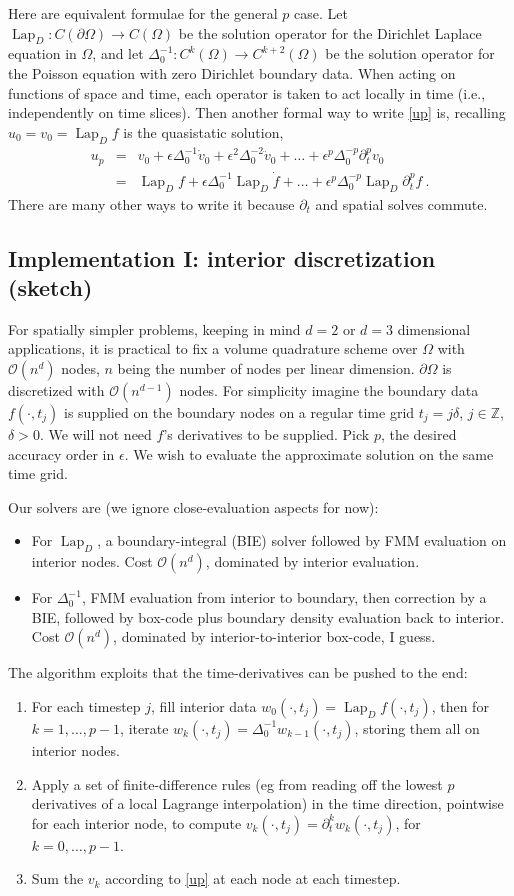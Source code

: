 \documentclass[10pt]{article}
\newcommand{\bi}{\begin{itemize}}
\newcommand{\ei}{\end{itemize}}
\newcommand{\ben}{\begin{enumerate}}
\newcommand{\een}{\end{enumerate}}
\newcommand{\bea}{\begin{eqnarray}}
\newcommand{\eea}{\end{eqnarray}}
\newcommand{\Z}{\mathbb{Z}}
\newcommand{\bigO}{{\mathcal O}}
\newcommand{\pO}{{\partial\Omega}}
\newcommand{\eps}{\epsilon}
\newcommand{\dt}{\partial_t}
\DeclareMathOperator{\Lap}{Lap}
\begin{document}
Here are equivalent formulae for the general $p$ case.
Let $\Lap_D: C(\pO) \to C(\Omega)$ be the solution operator for the Dirichlet
Laplace equation in $\Omega$, and let $\Delta_0^{-1} : C^k(\Omega) \to
C^{k+2}(\Omega)$ be the solution operator for the Poisson equation with
zero Dirichlet boundary data. When acting on functions of
space and time, each operator is taken to act locally in time
(i.e., independently on time slices).
Then another formal way to write \eqref{up} is, recalling $u_0=v_0=\Lap_D f$ is
the quasistatic solution,
\bea
u_p &=& v_0 + \eps \Delta_0^{-1} \dot v_0 + \eps^2 \Delta_0^{-2} \ddot v_0 +
\dots + \eps^{p} \Delta_0^{-p} \dt^{p} v_0
\\
&=&
\Lap_D f + \eps \Delta_0^{-1} \Lap_D \dot f + \ldots
+ \eps^{p} \Delta_0^{-p} \Lap_D \dt^{p} f
~.
\label{upformal}
\eea
There are many other ways to write it because $\dt$ and spatial solves
commute.


\subsection{Implementation I: interior discretization (sketch)}

For spatially simpler problems,
keeping in mind $d=2$ or $d=3$ dimensional applications,
it is practical to fix a
volume quadrature scheme over $\Omega$ with $\bigO(n^d)$ nodes,
$n$ being the number of nodes per linear dimension.
$\pO$ is discretized with $\bigO(n^{d-1})$ nodes.
For simplicity imagine the boundary data $f(\cdot,t_j)$ is supplied on the boundary nodes on a regular time grid $t_j=j\delta$, $j\in\Z$, $\delta>0$.
We will not need $f$'s derivatives to be supplied.
Pick $p$, the desired accuracy order in $\eps$.
We wish to evaluate the approximate solution on the same time grid.

Our solvers are (we ignore close-evaluation aspects for now):
\bi
\item
  For $\Lap_D$, a boundary-integral (BIE) solver followed by FMM evaluation on
  interior nodes. Cost $\bigO(n^d)$, dominated by interior evaluation.
\item
  For $\Delta_0^{-1}$, FMM evaluation from interior to boundary,
  then correction by a BIE, followed by box-code plus boundary density
  evaluation back to interior.
  Cost $\bigO(n^d)$, dominated by interior-to-interior box-code, I guess.
\ei

The algorithm exploits that the time-derivatives can be pushed to the end:
\ben
\item
  For each timestep $j$, fill interior data $w_0(\cdot,t_j)=\Lap_D f(\cdot,t_j)$,
  then for $k=1,\ldots,p-1$,
  iterate $w_k(\cdot,t_j)=\Delta_0^{-1} w_{k-1}(\cdot,t_j)$, storing them all
  on interior nodes.
\item
  Apply a set of finite-difference rules (eg from reading off the lowest $p$ derivatives of a local Lagrange interpolation)
  in the time direction, pointwise for each interior node,
  to compute
  $v_k(\cdot,t_j) = \dt^k w_k(\cdot,t_j)$, for $k=0,\ldots,p-1$.
\item
  Sum the $v_k$ according to \eqref{up} at each node at each timestep.
\een
\end{document}
